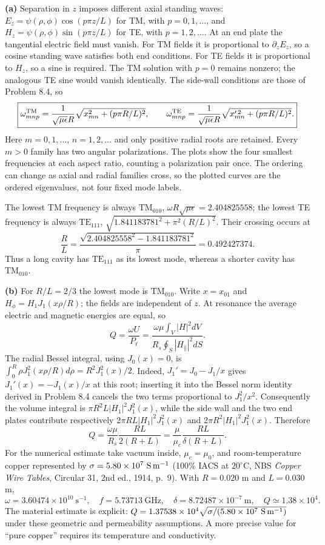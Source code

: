 \textbf{(a)} Separation in $z$ imposes different axial standing waves:
$E_z=\psi(\rho,\phi)\cos(p\pi z/L)$ for TM, with $p=0,1,\ldots$,
and $H_z=\psi(\rho,\phi)\sin(p\pi z/L)$ for TE, with $p=1,2,\ldots$.
At an end plate the tangential electric field must vanish.
For TM fields it is proportional to $\partial_zE_z$, so a cosine
standing wave satisfies both end conditions. For TE fields it is
proportional to $H_z$, so a sine is required. The TM solution with
$p=0$ remains nonzero; the analogous TE sine would vanish identically.
The side-wall conditions are those of Problem 8.4, so
\[
\boxed{\omega_{mnp}^{\rm TM}=\frac1{\sqrt{\mu\epsilon}R}
\sqrt{x_{mn}^2+(p\pi R/L)^2},\qquad
\omega_{mnp}^{\rm TE}=\frac1{\sqrt{\mu\epsilon}R}
\sqrt{x_{mn}'^{\,2}+(p\pi R/L)^2}.}
\]
Here $m=0,1,\ldots$, $n=1,2,\ldots$ and only positive radial roots
are retained.  Every $m>0$ family has two angular polarizations.
The plots show the four smallest frequencies at each aspect ratio,
counting a polarization pair once.  The ordering can change as
axial and radial families cross, so the plotted curves are the
ordered eigenvalues, not four fixed mode labels.
\begin{center}
\quad

\end{center}
The lowest TM frequency is always $\mathrm{TM}_{010}$,
$\omega R\sqrt{\mu\epsilon}=2.404825558$; the lowest TE frequency
is always $\mathrm{TE}_{111}$,
$\sqrt{1.841183781^2+\pi^2(R/L)^2}$.
Their crossing occurs at
\[
\frac RL=\frac{\sqrt{2.404825558^2-1.841183781^2}}\pi
=0.492427374.
\]
Thus a long cavity has $\mathrm{TE}_{111}$ as its lowest mode,
whereas a shorter cavity has $\mathrm{TM}_{010}$.

\textbf{(b)} For $R/L=2/3$ the lowest mode is $\mathrm{TM}_{010}$.
Write $x=x_{01}$ and $H_\phi=H_1J_1(x\rho/R)$; the fields are
independent of $z$.  At resonance the average electric and magnetic
energies are equal, so
\[
Q=\frac{\omega U}{P_{\ell}}
=\frac{\omega\mu\int_V|H|^2dV}{R_s\oint_S|H_\parallel|^2dS}.
\]
The radial Bessel integral, using $J_0(x)=0$, is
$\int_0^R\rho J_1^2(x\rho/R)d\rho=R^2J_1^2(x)/2$.
Indeed, $J_1'=J_0-J_1/x$ gives $J_1'(x)=-J_1(x)/x$ at this
root; inserting it into the Bessel norm identity derived in
Problem 8.4 cancels the two terms proportional to $J_1^2/x^2$.
Consequently the volume integral is
$\pi R^2L|H_1|^2J_1^2(x)$, while the side wall and the two end
plates contribute respectively
$2\pi RL|H_1|^2J_1^2(x)$ and
$2\pi R^2|H_1|^2J_1^2(x)$.  Therefore
\[
\boxed{Q=\frac{\omega\mu}{R_s}\frac{RL}{2(R+L)}
=\frac\mu{\mu_c}\frac{RL}{\delta(R+L)}.}
\]
For the numerical estimate take vacuum inside, $\mu_c=\mu_0$,
and room-temperature copper represented by
$\sigma=5.80\times10^7\ {\rm S\,m^{-1}}$ (100\% IACS at
$20^\circ$C, NBS \emph{Copper Wire Tables}, Circular 31,
2nd ed., 1914, p.~9).  With $R=0.020$ m and $L=0.030$ m,
\[
\omega=3.60474\times10^{10}\ \mathrm{s^{-1}},\quad
f=5.73713\ \mathrm{GHz},\quad\delta=8.72487\times10^{-7}\ \mathrm{m},
\quad\boxed{Q\simeq1.38\times10^4.}
\]
The material estimate is explicit: $Q=1.37538\times10^4
\sqrt{\sigma/(5.80\times10^7\ {\rm S\,m^{-1}})}$ under these
geometric and permeability assumptions.  A more precise value for
``pure copper'' requires its temperature and conductivity.

